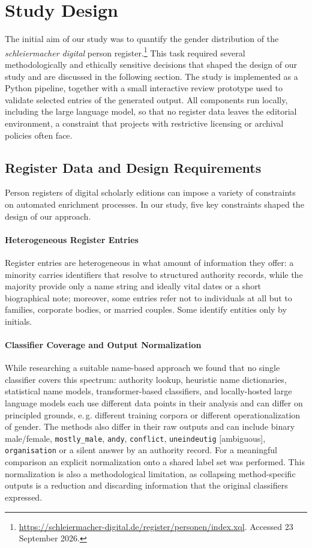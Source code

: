 \documentclass{eceasst}
\newcommand{\eg}{e.\,g.}
\begin{document}
\section{Study Design}
\label{sec:study_design}

The initial aim of our study was to quantify the gender distribution of the \textit{schleiermacher digital} person register.\footnote{\url{https://schleiermacher-digital.de/register/personen/index.xql}. Accessed 23 September 2026.} This task required several methodologically and ethically sensitive decisions that shaped the design of our study and are discussed in the following section.
The study is implemented as a Python pipeline, together with a small interactive review prototype used to validate selected entries of the generated output. All components run locally, including the large language model, so that no register data leaves the editorial environment, a constraint that projects with restrictive licensing or archival policies often face.

\subsection{Register Data and Design Requirements}
\label{constraints}
Person registers of digital scholarly editions can impose a variety of constraints on automated enrichment processes. In our study, five key constraints shaped the design of our approach.

\paragraph{Heterogeneous Register Entries} Register entries are heterogeneous in what amount of information they offer: a minority carries identifiers that resolve to structured authority records, while the majority provide only a name string and ideally vital dates or a short biographical note; moreover, some entries refer not to individuals at all but to families, corporate bodies, or married couples. Some identify entities only by initials.

\paragraph{Classifier Coverage and Output Normalization} While researching a suitable name-based approach we found that no single classifier covers this spectrum: authority lookup, heuristic name dictionaries, statistical name models, transformer-based classifiers, and locally-hosted large language models each use different data points in their analysis and can differ on principled grounds, \eg{} different training corpora or different operationalization of gender. The methods also differ in their raw outputs and can include binary male/female, \texttt{mostly\-\_male}, \texttt{andy}, \texttt{conflict}, \texttt{uneindeutig} [ambiguous], \texttt{organisation} or a silent answer by an authority record. For a meaningful comparison an explicit normalization onto a shared label set was performed. This normalization is also a methodological limitation, as collapsing method-specific outputs is a reduction and discarding information that the original classifiers expressed.
\end{document}
